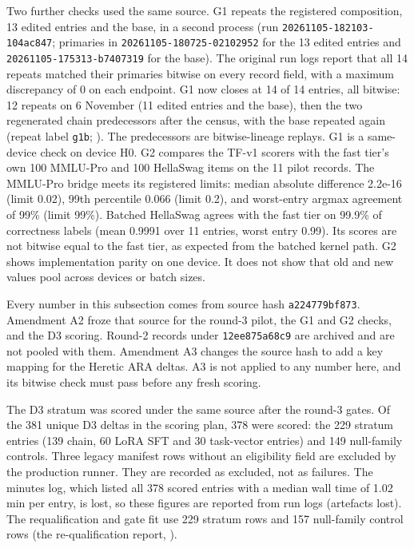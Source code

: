 Two further checks used the same source. G1 repeats the registered composition, 13 edited entries and the base, in a second process (run \texttt{20261105-182103-104ac847}; primaries in \texttt{20261105-180725-02102952} for the 13 edited entries and \texttt{20261105-175313-b7407319} for the base). The original run logs report that all 14 repeats matched their primaries bitwise on every record field, with a maximum discrepancy of 0 on each endpoint. %
G1 now closes at 14 of 14 entries, all bitwise: 12 repeats on 6 November (11 edited entries and the base), then the two regenerated chain predecessors after the census, with the base repeated again (repeat label \texttt{g1b}; ).
The predecessors are bitwise-lineage replays. G1 is a same-device check on device H0. G2 compares the TF-v1 scorers with the fast tier's own 100 MMLU-Pro and 100 HellaSwag items on the 11 pilot records. The MMLU-Pro bridge meets its registered limits: median absolute difference 2.2e-16 (limit 0.02), 99th percentile 0.066 (limit 0.2), and worst-entry argmax agreement of 99\% (limit 99\%). Batched HellaSwag agrees with the fast tier on 99.9\% of correctness labels (mean 0.9991 over 11 entries, worst entry 0.99). Its scores are not bitwise equal to the fast tier, as expected from the batched kernel path. G2 shows implementation parity on one device. It does not show that old and new values pool across devices or batch sizes.

Every number in this subsection comes from source hash \texttt{a224779bf873}. Amendment A2 froze that source for the round-3 pilot, the G1 and G2 checks, and the D3 scoring. Round-2 records under \texttt{12ee875a68c9} are archived and are not pooled with them. Amendment A3 changes the source hash to add a key mapping for the Heretic ARA deltas. A3 is not applied to any number here, and its bitwise check must pass before any fresh scoring.

The D3 stratum was scored under the same source after the round-3 gates. Of the 381 unique D3 deltas in the scoring plan, 378 were scored: the 229 stratum entries (139 chain, 60 LoRA SFT and 30 task-vector entries) and 149 null-family controls. Three legacy manifest rows without an eligibility field are excluded by the production runner. They are recorded as excluded, not as failures. The minutes log, which listed all 378 scored entries with a median wall time of 1.02 min per entry, is lost, so these figures are reported from run logs (artefacts lost). The requalification and gate fit use 229 stratum rows and 157 null-family control rows (the re-qualification report, ).

